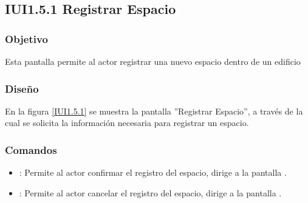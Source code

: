\subsection{IUI1.5.1 Registrar Espacio}

\subsubsection{Objetivo}
	Esta pantalla permite al actor registrar una nuevo espacio dentro de un edificio

\subsubsection{Diseño}

    En la figura \ref{IUI1.5.1} se muestra la pantalla ''Registrar Espacio'', a través de la cual se solicita la información necesaria para registrar un espacio.
 

\subsubsection{Comandos}
    \begin{itemize}
	\item {}: Permite al actor confirmar el registro del espacio, dirige a la pantalla .
	
	\item {}: Permite al actor cancelar el registro del espacio, dirige a la pantalla .
    \end{itemize}
